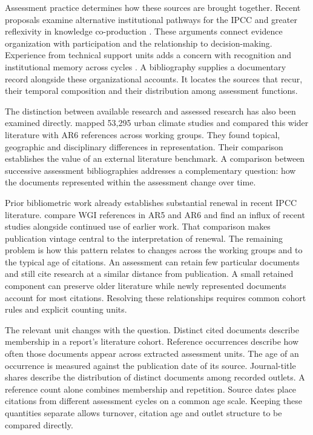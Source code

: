 \documentclass[11pt,a4paper]{article}
\begin{document}
Assessment practice determines how these sources are brought together. Recent proposals examine alternative institutional pathways for the IPCC and greater reflexivity in knowledge co-production \citep{asayama2023pathways,mochizuki2023reflexivity}. These arguments connect evidence organization with participation and the relationship to decision-making. Experience from technical support units adds a concern with recognition and institutional memory across cycles \citep{slade2024lessons}. A bibliography supplies a documentary record alongside these organizational accounts. It locates the sources that recur, their temporal composition and their distribution among assessment functions.

The distinction between available research and assessed research has also been examined directly. \citet{montfort2025urban} mapped 53,295 urban climate studies and compared this wider literature with AR6 references across working groups. They found topical, geographic and disciplinary differences in representation. Their comparison establishes the value of an external literature benchmark. A comparison between successive assessment bibliographies addresses a complementary question: how the documents represented within the assessment change over time.

Prior bibliometric work already establishes substantial renewal in recent IPCC literature. \citet{huang2023ar5ar6} compare WGI references in AR5 and AR6 and find an influx of recent studies alongside continued use of earlier work. That comparison makes publication vintage central to the interpretation of renewal. The remaining problem is how this pattern relates to changes across the working groups and to the typical age of citations. An assessment can retain few particular documents and still cite research at a similar distance from publication. A small retained component can preserve older literature while newly represented documents account for most citations. Resolving these relationships requires common cohort rules and explicit counting units.

The relevant unit changes with the question. Distinct cited documents describe membership in a report's literature cohort. Reference occurrences describe how often those documents appear across extracted assessment units. The age of an occurrence is measured against the publication date of its source. Journal-title shares describe the distribution of distinct documents among recorded outlets. A reference count alone combines membership and repetition. Source dates place citations from different assessment cycles on a common age scale. Keeping these quantities separate allows turnover, citation age and outlet structure to be compared directly.
\end{document}
